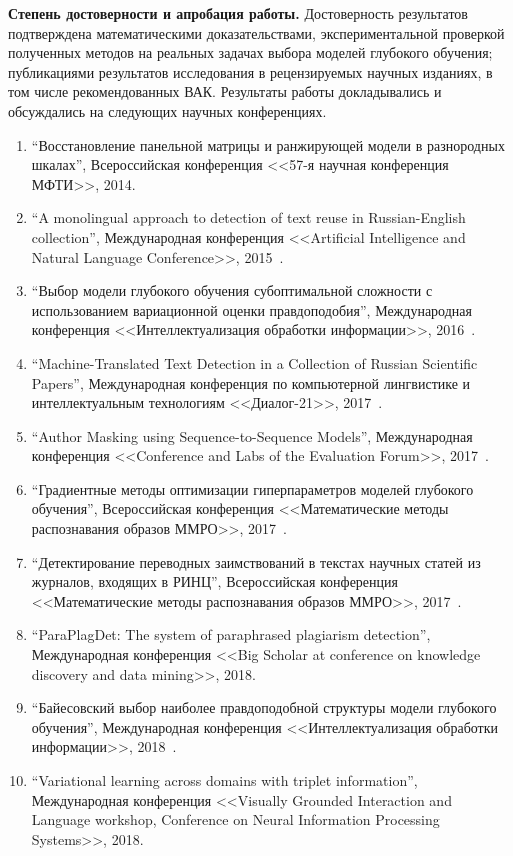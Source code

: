 \vspace{0.5cm}
\textbf{Степень достоверности и апробация работы.} Достоверность результатов подтверждена математическими доказательствами, экспериментальной проверкой полученных методов на реальных задачах выбора моделей глубокого обучения; публикациями результатов исследования в рецензируемых научных изданиях, в том числе рекомендованных ВАК. Результаты работы докладывались и обсуждались на следующих научных конференциях.
\begin{enumerate}
\item ``Восстановление панельной матрицы и ранжирующей модели в разнородных шкалах'', Всероссийская конференция <<57-я научная конференция МФТИ>>, 2014.
\item ``A monolingual approach to detection of text reuse in Russian-English collection'', Международная конференция <<Artificial Intelligence and Natural Language Conference>>, 2015~\cite{monolingual}.
\item ``Выбор модели глубокого обучения субоптимальной сложности с использованием вариационной оценки правдоподобия'', Международная конференция <<Интеллектуализация обработки информации>>, 2016~\cite{ioi16}.
\item ``Machine-Translated Text Detection in a Collection of Russian
Scientific Papers'', Международная конференция по компьютерной лингвистике и интеллектуальным технологиям <<Диалог-21>>, 2017~\cite{dialog}.
\item ``Author Masking using Sequence-to-Sequence Models'', Международная конференция <<Conference and Labs of the Evaluation Forum>>, 2017~\cite{pan_s2s}.
\item ``Градиентные методы оптимизации гиперпараметров моделей глубокого обучения'', Всероссийская конференция <<Математические методы распознавания образов ММРО>>, 2017~\cite{mmro17_hyper}.
\item ``Детектирование переводных заимствований в текстах научных статей из журналов, входящих в РИНЦ'', Всероссийская конференция <<Математические методы распознавания образов ММРО>>, 2017~\cite{mmro17_plag}.
\item ``ParaPlagDet: The system of paraphrased plagiarism detection'', Международная конференция <<Big Scholar at conference on knowledge discovery and data mining>>, 2018.
\item ``Байесовский выбор наиболее правдоподобной структуры модели глубокого обучения'', Международная конференция <<Интеллектуализация обработки информации>>, 2018~\cite{ioi18}.
\item ``Variational learning across domains with triplet
information'', Международная конференция <<Visually Grounded Interaction and Language workshop, Conference on Neural Information Processing Systems>>, 2018.
\end{enumerate}

